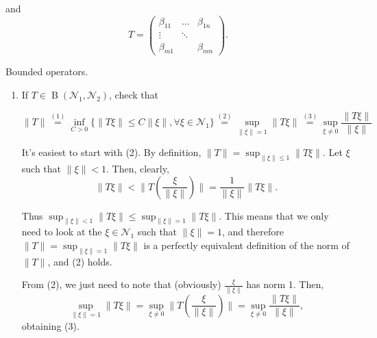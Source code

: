 \documentclass{article}
\theoremstyle{remark}
\newenvironment{exercise}[1]
  {\renewcommand\theinnerex{#1}\innerex}
  {\endinnerex}
\DeclareMathOperator{\bounded}{B}
\begin{document}
\begin{exercise}{1.1.9}
    and
    \[ T = \begin{pmatrix}
            \beta_{11} & \dots  & \beta_{1n} \\
            \vdots     & \ddots &            \\
            \beta_{m1} &        & \beta_{mn}
        \end{pmatrix}.
    \]

\end{exercise}


\begin{exercise}{1.1.13} Bounded operators.

    \begin{enumerate}
        \item If $T\in \bounded (\mathcal{N}_1, \mathcal{N}_2)$, check that

              $$ \lVert T \rVert \stackrel{(1)}{=} \inf_{C>0} \{ \lVert T\xi \rVert \leq C \lVert \xi \rVert , \forall \xi \in \mathcal{N}_1 \}
                  \stackrel{(2)}{=} \sup_{\lVert \xi \rVert = 1} \lVert T \xi \rVert
                  \stackrel{(3)}{=} \sup_{\xi \neq 0} \frac{\lVert T \xi \rVert}{\lVert \xi \rVert}
              $$

              It's easiest to start with (2). By definition, $\lVert T \rVert = \sup_{\lVert \xi \rVert \leq 1} \lVert T \xi \rVert$. Let $\xi$ such that $\lVert \xi \rVert < 1$.
              Then, clearly, $$\lVert T \xi \rVert < \lVert T\left( \frac{\xi}{\lVert \xi \rVert} \right) \rVert = \frac{1}{\lVert \xi \rVert}  \lVert T \xi \rVert.$$

              Thus $\sup_{\lVert \xi \rVert < 1} \lVert T \xi \rVert \leq \sup_{\lVert \xi \rVert = 1} \lVert T \xi \rVert$.
              This means that we only need to look at the $\xi \in \mathcal{N}_1$ such that $\lVert \xi \rVert = 1$,
              and therefore $\lVert T \rVert = \sup_{\lVert \xi \rVert = 1} \lVert T \xi \rVert$ is a perfectly equivalent definition of the norm of
              $\lVert T \rVert$, and (2) holds.

              From (2), we just need to note that (obviously) $\frac{\xi}{\lVert \xi \rVert}$ has norm 1. Then,
              $$ \sup_{\lVert \xi \rVert = 1} \lVert T \xi \rVert = \sup_{\xi \neq 0} \lVert T \left(\frac{\xi}{\lVert \xi \rVert}\right) \rVert
                  = \sup_{\xi \neq 0}  \frac{\lVert T \xi \rVert}{\lVert \xi \rVert} , $$
              obtaining (3).


\end{enumerate}
\end{exercise}
\end{document}

